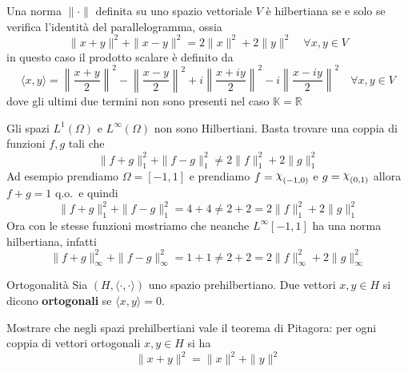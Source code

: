 \begin{proposition}
    Una norma \(\|\cdot \|\) definita su uno spazio vettoriale \(V\) è
    hilbertiana se e solo se verifica l'identità del parallelogramma, ossia
    \[
        \|x + y\|^2 + \|x - y\|^2 = 2\|x\|^2 + 2\|y\|^2 \quad \forall x, y \in V
    \]
    in questo caso il prodotto scalare è definito da
    \[
        \langle x,y \rangle = \left\|\frac{x+y}{2}\right\|^2 -
        \left\|\frac{x-y}{2}\right\|^2 + i
        \left\|\frac{x+iy}{2}\right\|^2 - i \left\|\frac{x-iy}{2}\right\|^2
        \quad \forall x, y \in V
    \]
    dove gli ultimi due termini non sono presenti nel caso \(\mathbb{K}=\mathbb{R}\) 
\end{proposition}

\begin{example}
    Gli spazi \(L^{1}{(\Omega)}\) e \(L^{\infty}{(\Omega)}\) non sono Hilbertiani. Basta trovare una
    coppia di funzioni \(f, g\) tali che 
    \[
        \|f + g\|_1^2 + \|f - g\|_1^2 \neq 2\|f\|_1^2 + 2\|g\|_1^2
    \]
    Ad esempio prendiamo \(\Omega = [-1,1]\) e prendiamo \(f = \rchi_{(-1, 0)}
    \) e \(g = \rchi_{{(0,1)}} \) allora \(f + g = 1\) q.o.~e quindi 
    \[
        \|f+g\|_1^2  + \|f-g\|_1^2 = 4 + 4 \neq 2 + 2 = 2\|f\|_1^2 + 2\|g\|_1^2
    \]
    Ora con le stesse funzioni mostriamo che neanche \(L^{\infty}{[-1, 1]}\) ha
    una norma hilbertiana, infatti
    \[
        \|f+g\|_{\infty}^2 + \|f-g\|_{\infty}^2 = 1 + 1 \neq 2 + 2 = 2\|f\|_{\infty}^2 + 2\|g\|_{\infty}^2
    \]
\end{example}

\begin{definition}{Ortogonalità}
    Sia \({(H, \langle \cdot ,\cdot  \rangle)}\) uno spazio prehilbertiano. Due
    vettori \(x, y \in H\) si dicono \textbf{ortogonali} se \(\langle x, y \rangle = 0\).
\end{definition}

\begin{eser}
    Mostrare che negli spazi prehilbertiani vale il teorema di Pitagora: 
    per ogni coppia di vettori ortogonali \(x, y \in H\) si ha
    \[
        \|x + y\|^2 = \|x\|^2 + \|y\|^2
    \]
\end{eser}

